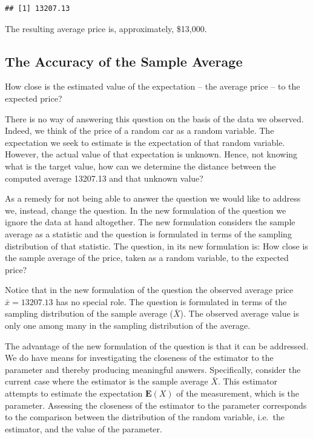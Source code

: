 \documentclass[
]{krantz}
\makeatletter
\newenvironment{Shaded}{\begin{snugshade}}{\end{snugshade}}
\newcommand{\DataTypeTok}[1]{\textcolor[rgb]{0.13,0.29,0.53}{#1}}
\newcommand{\KeywordTok}[1]{\textcolor[rgb]{0.13,0.29,0.53}{\textbf{#1}}}
\newcommand{\NormalTok}[1]{#1}
\newcommand{\OperatorTok}[1]{\textcolor[rgb]{0.81,0.36,0.00}{\textbf{#1}}}
\newcommand{\OtherTok}[1]{\textcolor[rgb]{0.56,0.35,0.01}{#1}}
\newcommand{\Expec}{\mathbf{E}}
\newenvironment{kframe}{%
\medskip{}
\setlength{\fboxsep}{.8em}
 \def\at@end@of@kframe{}%
 \ifinner\ifhmode%
  \def\at@end@of@kframe{\end{minipage}}%
  \begin{minipage}{\columnwidth}%
 \fi\fi%
 \def\FrameCommand##1{\hskip\@totalleftmargin \hskip-\fboxsep
 \colorbox{shadecolor}{##1}\hskip-\fboxsep
     \hskip-\linewidth \hskip-\@totalleftmargin \hskip\columnwidth}%
 \MakeFramed {\advance\hsize-\width
   \@totalleftmargin\z@ \linewidth\hsize
   \@setminipage}}%
 {\par\unskip\endMakeFramed%
 \at@end@of@kframe}
\renewenvironment{Shaded}{\begin{kframe}}{\end{kframe}}
\theoremstyle{definition}
\theoremstyle{definition}
\theoremstyle{definition}
\theoremstyle{remark}
\makeatother
\begin{document}
\begin{Shaded}
\end{Shaded}

\begin{verbatim}
## [1] 13207.13
\end{verbatim}

The resulting average price is, approximately, \$13,000.

\hypertarget{the-accuracy-of-the-sample-average}{%
\subsection{The Accuracy of the Sample Average}\label{the-accuracy-of-the-sample-average}}

How close is the estimated value of the expectation -- the average price
-- to the expected price?

There is no way of answering this question on the basis of the data we
observed. Indeed, we think of the price of a random car as a random
variable. The expectation we seek to estimate is the expectation of that
random variable. However, the actual value of that expectation is
unknown. Hence, not knowing what is the target value, how can we
determine the distance between the computed average 13207.13 and that
unknown value?

As a remedy for not being able to answer the question we would like to
address we, instead, change the question. In the new formulation of the
question we ignore the data at hand altogether. The new formulation
considers the sample average as a statistic and the question is
formulated in terms of the sampling distribution of that statistic. The
question, in its new formulation is: How close is the sample average of
the price, taken as a random variable, to the expected price?

Notice that in the new formulation of the question the observed average
price \(\bar x = 13207.13\) has no special role. The question is
formulated in terms of the sampling distribution of the sample average
(\(\bar X\)). The observed average value is only one among many in the
sampling distribution of the average.

The advantage of the new formulation of the question is that it can be
addressed. We do have means for investigating the closeness of the
estimator to the parameter and thereby producing meaningful answers.
Specifically, consider the current case where the estimator is the
sample average \(\bar X\). This estimator attempts to estimate the
expectation \(\Expec(X)\) of the measurement, which is the parameter.
Assessing the closeness of the estimator to the parameter corresponds to
the comparison between the distribution of the random variable, i.e.~the
estimator, and the value of the parameter.
\end{document}
